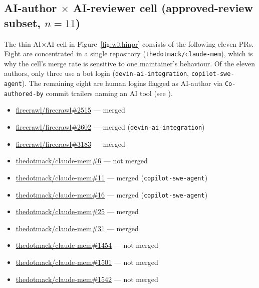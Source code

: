 
\subsection{AI-author $\times$ AI-reviewer cell (approved-review subset, $n=11$)}
\label{app:examples-aixai}

The thin AI$\times$AI cell in Figure~\ref{fig:withinpr} consists of the following
eleven PRs. Eight are concentrated in a single repository
(\texttt{thedotmack/claude-mem}), which is why the cell's merge rate is
sensitive to one maintainer's behaviour. Of the eleven authors, only three
use a bot login (\texttt{devin-ai-integration}, \texttt{copilot-swe-agent}).
The remaining eight are human logins flagged as AI-author
via \texttt{Co-authored-by} commit trailers naming an AI tool (see
).

\begin{itemize}\itemsep0pt\parskip0pt
  \item \href{https://github.com/firecrawl/firecrawl/pull/2515}{firecrawl/firecrawl\#2515} --- merged
  \item \href{https://github.com/firecrawl/firecrawl/pull/2602}{firecrawl/firecrawl\#2602} --- merged (\texttt{devin-ai-integration})
  \item \href{https://github.com/firecrawl/firecrawl/pull/3183}{firecrawl/firecrawl\#3183} --- merged
  \item \href{https://github.com/thedotmack/claude-mem/pull/6}{thedotmack/claude-mem\#6} --- not merged
  \item \href{https://github.com/thedotmack/claude-mem/pull/11}{thedotmack/claude-mem\#11} --- merged (\texttt{copilot-swe-agent})
  \item \href{https://github.com/thedotmack/claude-mem/pull/16}{thedotmack/claude-mem\#16} --- merged (\texttt{copilot-swe-agent})
  \item \href{https://github.com/thedotmack/claude-mem/pull/25}{thedotmack/claude-mem\#25} --- merged
  \item \href{https://github.com/thedotmack/claude-mem/pull/31}{thedotmack/claude-mem\#31} --- merged
  \item \href{https://github.com/thedotmack/claude-mem/pull/1454}{thedotmack/claude-mem\#1454} --- not merged
  \item \href{https://github.com/thedotmack/claude-mem/pull/1501}{thedotmack/claude-mem\#1501} --- not merged
  \item \href{https://github.com/thedotmack/claude-mem/pull/1542}{thedotmack/claude-mem\#1542} --- not merged
\end{itemize}

